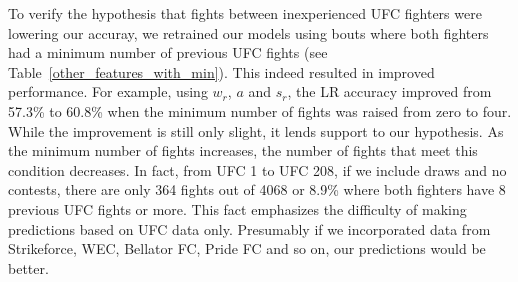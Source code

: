 To verify the hypothesis that fights between inexperienced UFC fighters were
lowering our accuray, we retrained our models using
bouts where both fighters had a minimum number of previous
UFC fights (see Table~\ref{other_features_with_min}).
This indeed resulted in improved performance. For example,
using $w_r$, $a$ and $s_r$, the LR accuracy improved from 57.3\% to 60.8\% when the minimum
number of fights was raised from zero to four.
While the improvement is still only slight, it lends support
to our hypothesis. As the minimum number of fights increases,
the number of fights that meet this condition decreases. In fact,
from UFC 1 to UFC 208, if we include draws and no contests, there are
only 364 fights out of 4068 or 8.9\% where both fighters have 8 previous UFC
fights or more. This fact emphasizes the difficulty
of making predictions based on UFC data only. Presumably if we incorporated
data from Strikeforce, WEC, Bellator FC, Pride FC and so on, our predictions would
be better.


